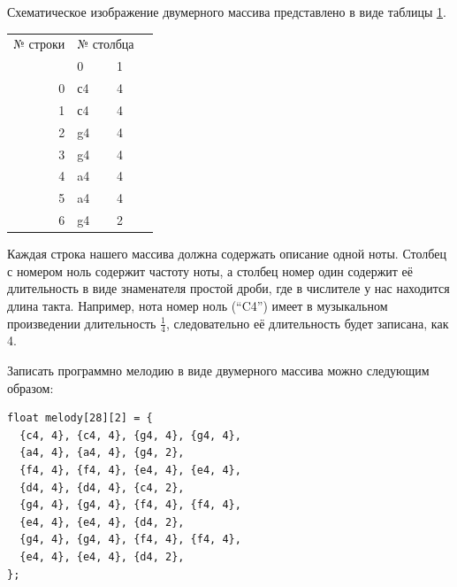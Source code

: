 \documentclass[a4paper,twoside]{book}
\begin{document}
Схематическое изображение двумерного массива представлено в виде таблицы
\ref{table:array-example-2}.

\begin{table}[ht]
  \centering
  \begin{tabular}{r|l|l|l}
    \multicolumn{1}{l}{№ строки} & \multicolumn{2}{l}{№ столбца}                 &   \\
    \multicolumn{1}{l}{}         & \multicolumn{1}{l}{0} & \multicolumn{1}{l}{1} &   \\ 
    \cline{2-3}
    0                            & с4                    & 4                     &   \\ 
    \cline{2-3}
    1                            & с4                    & 4                     &   \\
    \cline{2-3}
    2                            & g4                    & 4                     &   \\
    \cline{2-3}
    3                            & g4                    & 4                     &   \\
    \cline{2-3}
    4                            & a4                    & 4                     &   \\
    \cline{2-3}
    5                            & a4                    & 4                     &   \\
    \cline{2-3}
    6                            & g4                    & 2                     &   \\
    \cline{2-3}
  \end{tabular}
  \label{table:array-example-2}
\end{table}

Каждая строка нашего массива должна содержать описание одной ноты. Столбец с
номером ноль содержит частоту ноты, а столбец номер один содержит её
длительность в виде знаменателя простой дроби, где в числителе у нас находится
длина такта. Например, нота номер ноль (``C4'') имеет в музыкальном произведении
длительность $\frac{1}{4}$, следовательно её длительность будет записана, как 4.

Записать программно мелодию в виде двумерного массива можно следующим образом:

\begin{verbatim}
float melody[28][2] = {
  {c4, 4}, {c4, 4}, {g4, 4}, {g4, 4},
  {a4, 4}, {a4, 4}, {g4, 2},
  {f4, 4}, {f4, 4}, {e4, 4}, {e4, 4},
  {d4, 4}, {d4, 4}, {c4, 2},
  {g4, 4}, {g4, 4}, {f4, 4}, {f4, 4},
  {e4, 4}, {e4, 4}, {d4, 2},
  {g4, 4}, {g4, 4}, {f4, 4}, {f4, 4},
  {e4, 4}, {e4, 4}, {d4, 2},
};
\end{verbatim}
\end{document}
